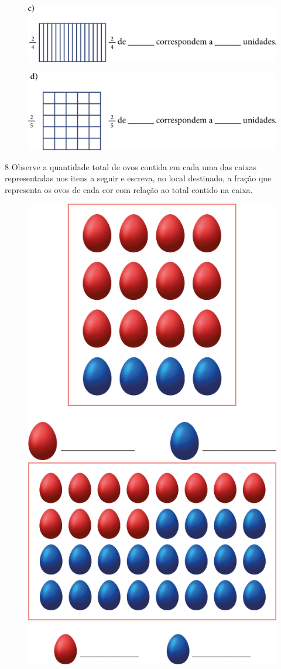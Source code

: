 \begin{figure}[htpb!]
\includegraphics[width=\textwidth]{media/image60.png}
\end{figure}

\begin{figure}[htpb!]
\includegraphics[width=\textwidth]{media/image61.png}
\end{figure}


\pagebreak
\num{8} Observe a quantidade total de ovos contida em cada uma das caixas
representadas nos itens a seguir e escreva, no local destinado, a fração que
representa os ovos de cada cor com relação ao total contido na caixa.

\begin{figure}[htpb!]
\centering
\includegraphics[width=.4\textwidth]{media/image62.png}
\includegraphics[width=.4\textwidth]{media/image63.png}
\end{figure}

